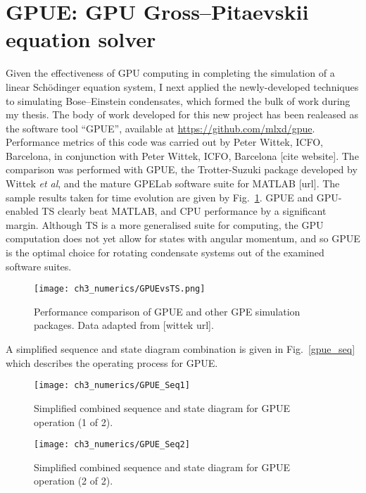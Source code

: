 \section{GPUE: GPU Gross--Pitaevskii equation solver}

Given the effectiveness of GPU computing in completing the simulation of a linear Sch\"odinger equation system, I next applied the newly-developed techniques to simulating Bose--Einstein condensates, which formed the bulk of work during my thesis. The body of work developed for this new project has been realeased as the software tool ``GPUE'', available at \url{https://github.com/mlxd/gpue}. Performance metrics of this code was carried out by Peter Wittek, ICFO, Barcelona, in conjunction with Peter Wittek, ICFO, Barcelona [cite website]. The comparison was performed with GPUE, the Trotter-Suzuki package developed by Wittek \textit{et al}, and the mature GPELab software suite for MATLAB [url]. The sample results taken for time evolution are given by Fig.~\ref{fig:gpuevsts}. GPUE and GPU-enabled TS clearly beat MATLAB, and CPU performance by a significant margin. Although TS is a more generalised suite for computing, the GPU computation does not yet allow for states with angular momentum, and so GPUE is the optimal choice for rotating condensate systems out of the examined software suites.

\begin{figure}[htb]
    \centering
    \texttt{[image: ch3\_numerics/GPUEvsTS.png]}
    \caption{Performance comparison of GPUE and other GPE simulation packages. Data adapted from [wittek url].}
    \label{fig:gpuevsts}
\end{figure}

A simplified sequence and state diagram combination is given in Fig.~\ref{gpue_seq} which describes the operating process for GPUE.

\begin{figure}[h]
    \centering
        \texttt{[image: ch3\_numerics/GPUE\_Seq1]}
    \caption{Simplified combined sequence and state diagram for GPUE operation (1 of 2).}
    \label{fig:gpue_seq}
\end{figure}
\begin{figure}[h]
    \centering
        \texttt{[image: ch3\_numerics/GPUE\_Seq2]}
    \caption{Simplified combined sequence and state diagram for GPUE operation (2 of 2).}
    \label{fig:gpue_seq}
\end{figure}
